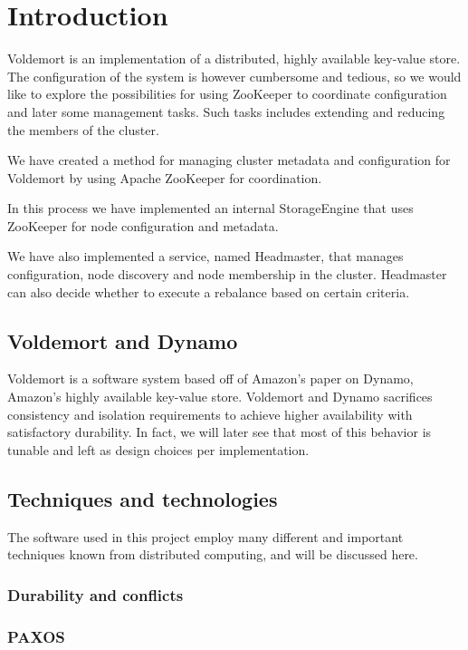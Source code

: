 
\section{Introduction}
Voldemort is an implementation of a distributed, highly available key-value store.
The configuration of the system is however cumbersome and tedious, so we would like to explore the possibilities for using ZooKeeper to coordinate configuration and later some management tasks.
Such tasks includes extending and reducing the members of the cluster.

We have created a method for managing cluster metadata and configuration for Voldemort by using Apache ZooKeeper for coordination.

In this process we have implemented an internal StorageEngine that uses ZooKeeper for node configuration and metadata.

We have also implemented a service, named Headmaster, that manages configuration, node discovery and node membership in the cluster.
Headmaster can also decide whether to execute a rebalance based on certain criteria.

\subsection{Voldemort and Dynamo}
Voldemort is a software system based off of Amazon's paper on Dynamo, Amazon's highly available key-value store.
Voldemort and Dynamo sacrifices consistency and isolation requirements to achieve higher availability with satisfactory durability.
In fact, we will later see that most of this behavior is tunable and left as design choices per implementation.

\subsection{Techniques and technologies}
The software used in this project employ many different and important techniques known from distributed computing, and will be discussed here.


\subsubsection{Durability and conflicts}

\subsubsection{PAXOS}

